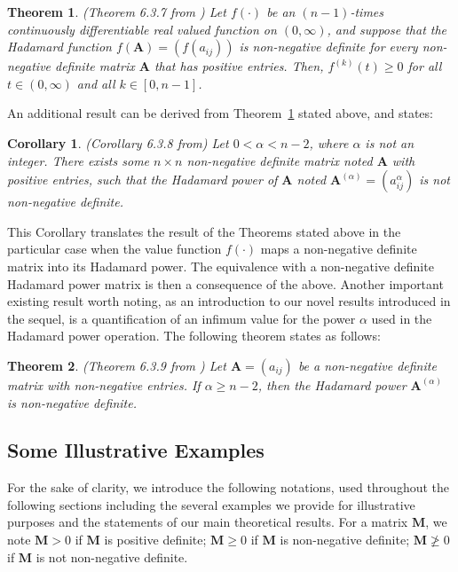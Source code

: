 \documentclass[conference,letterpaper]{IEEEtran}
\numberwithin{equation}{section}
\newtheorem{theorem}{{\sc Theorem}}
\newtheorem{coro}{{\sc Corollary}}[section]
\begin{document}
\begin{theorem}\label{oldth2} (Theorem 6.3.7 from \cite{horn_johnson_1991})
	Let $f(\cdot)$ be an $(n-1)$-times continuously differentiable real valued function on $(0,\infty)$, and suppose that the Hadamard function $f(\mathbf{A})=(f(a_{ij}))$ is non-negative definite for every non-negative definite matrix $\mathbf{A}$ that has positive entries. Then, $f^{(k)}(t)\geq 0$ for all $t\in(0,\infty)$ and all $k \in [0,n-1]$.
\end{theorem}
\medskip
An additional result can be derived from Theorem~\ref{oldth2} stated above, and states:
\begin{coro}(Corollary 6.3.8 from\cite{horn_johnson_1991})
	Let $0<\alpha<n-2$, where $\alpha$ is not an integer. 
	There exists some $n\times n$ non-negative definite matrix noted $\mathbf{A}$ with positive entries, such that the Hadamard power of  $\mathbf{A}$ noted $\mathbf{A}^{(\alpha)}=(a_{ij}^\alpha)$ is not non-negative definite.
\end{coro}
This Corollary translates the result of the Theorems stated above in the particular case when the value function $f(\cdot)$ maps a non-negative definite matrix into its Hadamard power. 
The equivalence with a non-negative definite Hadamard power matrix is then a consequence of the above.
Another important existing result worth noting, as an introduction to our novel results introduced in the sequel, is a quantification of an infimum value for the power $\alpha$ used in the Hadamard power operation. The following theorem states as follows:
\medskip
\begin{theorem} (Theorem 6.3.9 from \cite{horn_johnson_1991})
	Let $\mathbf{A}=(a_{ij})$ be a non-negative definite matrix with non-negative entries. If $\alpha \geq n-2$, then the Hadamard power $\mathbf{A}^{(\alpha)}$ is non-negative definite. 
\end{theorem}

\subsection{Some Illustrative Examples}
For the sake of clarity, we introduce the following notations, used throughout the following sections including the several examples we provide for illustrative purposes and the statements of our main theoretical results.  
For a matrix $\mathbf{M}$, we note $\mathbf{M}>0$ if $\mathbf{M}$ is positive definite; $\mathbf{M}\geq 0$ if $\mathbf{M}$ is non-negative definite; $\mathbf{M}\ngeqslant 0$ if $\mathbf{M}$ is not non-negative definite.
\end{document}
